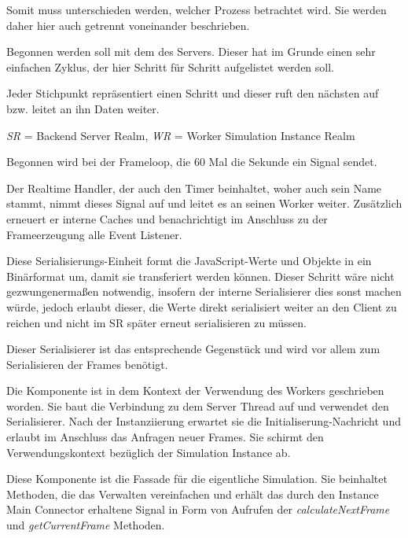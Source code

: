 Somit muss unterschieden werden, welcher Prozess betrachtet wird.
Sie werden daher hier auch getrennt voneinander beschrieben.

Begonnen werden soll mit dem des Servers.
Dieser hat im Grunde einen sehr einfachen Zyklus, der hier Schritt für Schritt aufgelistet werden soll.

Jeder Stichpunkt repräsentiert einen Schritt und dieser ruft den nächsten auf bzw. leitet an ihn Daten weiter.

\textit{SR} = Backend Server Realm, \textit{WR} = Worker Simulation Instance Realm

\begin{itemize}
     Begonnen wird bei der Frameloop, die 60 Mal die Sekunde ein Signal sendet.

     Der Realtime Handler, der auch den Timer beinhaltet, woher auch sein Name stammt, nimmt dieses Signal auf und leitet es an seinen Worker weiter.
    Zusätzlich erneuert er interne Caches und benachrichtigt im Anschluss zu der Frameerzeugung alle Event Listener.

     Diese Serialisierungs-Einheit formt die JavaScript-Werte und Objekte in ein Binärformat um, damit sie transferiert werden können.
    Dieser Schritt wäre nicht gezwungenermaßen notwendig, insofern der interne Serialisierer dies sonst machen würde, jedoch erlaubt dieser, die Werte direkt serialisiert weiter an den Client zu reichen und nicht im SR später erneut serialisieren zu müssen.

     Dieser Serialisierer ist das entsprechende Gegenstück und wird vor allem zum Serialisieren der Frames benötigt.

     Die Komponente ist in dem Kontext der Verwendung des Workers geschrieben worden.
    Sie baut die Verbindung zu dem Server Thread auf und verwendet den Serialisierer.
    Nach der Instanziierung erwartet sie die Initialiserung-Nachricht und erlaubt im Anschluss das Anfragen neuer Frames.
    Sie schirmt den Verwendungskontext bezüglich der Simulation Instance ab.

     Diese Komponente ist die Fassade für die eigentliche Simulation.
    Sie beinhaltet Methoden, die das Verwalten vereinfachen und erhält das durch den Instance Main Connector erhaltene Signal in Form von Aufrufen der \textit{calculateNextFrame} und \textit{getCurrentFrame} Methoden.


\end{itemize}
